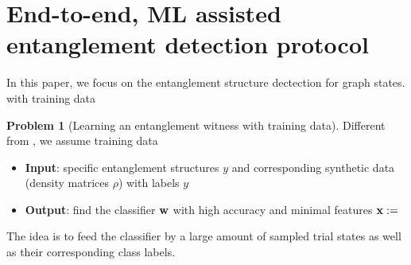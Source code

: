 \documentclass[
reprint,
aps,
pra,
]{revtex4-2}
\theoremstyle{plain}
\theoremstyle{definition}
\newtheorem{problem}{Problem}
\newcommand{\dm}{\rho}
\begin{document}
\section{End-to-end, ML assisted entanglement detection protocol}

In this paper, we focus on the entanglement structure dectection for graph states.
with training data
\begin{problem}[Learning an entanglement witness with training data]
	Different from , we assume training data
	\begin{itemize}
		\item \textbf{Input}: specific entanglement structures $y$ and corresponding synthetic data (density matrices $\dm$) with labels $y$
		\item \textbf{Output}: find the classifier $\vb{w}$ with high accuracy and minimal features $\vb{x}:=$
	\end{itemize}
\end{problem}
The idea is to feed the classifier by a large amount of sampled trial states
as well as their corresponding class labels.



\end{document}
